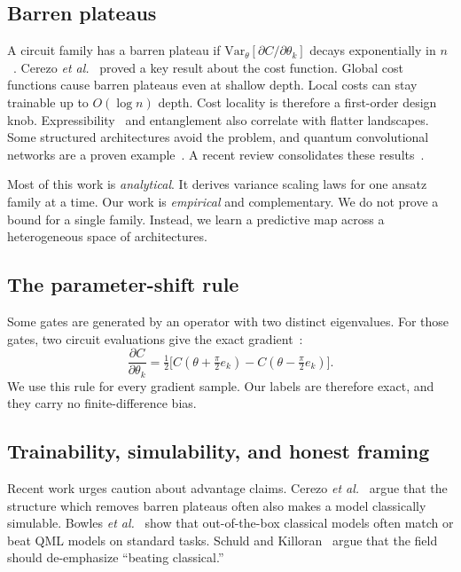 \documentclass[aps,pra,preprint,amsmath,amssymb,floatfix,nofootinbib]{revtex4-2}
\begin{document}
\subsection{Barren plateaus}
A circuit family has a barren plateau if
$\mathrm{Var}_\theta[\partial C/\partial\theta_k]$ decays exponentially in
$n$~\cite{mcclean2018barren}. Cerezo \textit{et al.}~\cite{cerezo2021cost} proved
a key result about the cost function. Global cost functions cause barren plateaus
even at shallow depth. Local costs can stay trainable up to $O(\log n)$ depth.
Cost locality is therefore a first-order design knob.
Expressibility~\cite{holmes2022expressibility} and entanglement also correlate
with flatter landscapes. Some structured architectures avoid the problem, and
quantum convolutional networks are a proven example~\cite{pesah2021absence}. A
recent review consolidates these results~\cite{larocca2025barren}.

Most of this work is \emph{analytical}. It derives variance scaling laws for one
ansatz family at a time. Our work is \emph{empirical} and complementary. We do
not prove a bound for a single family. Instead, we learn a predictive map across
a heterogeneous space of architectures.

\subsection{The parameter-shift rule}
Some gates are generated by an operator with two distinct eigenvalues. For those
gates, two circuit evaluations give the exact
gradient~\cite{mitarai2018circuit,schuld2019param}:
\begin{equation}
\frac{\partial C}{\partial\theta_k}
  = \tfrac{1}{2}\big[C(\theta + \tfrac{\pi}{2}e_k)
  - C(\theta - \tfrac{\pi}{2}e_k)\big].
\end{equation}
We use this rule for every gradient sample. Our labels are therefore exact, and
they carry no finite-difference bias.

\subsection{Trainability, simulability, and honest framing}
Recent work urges caution about advantage claims. Cerezo \textit{et
al.}~\cite{cerezo2025simulability} argue that the structure which removes barren
plateaus often also makes a model classically simulable. Bowles \textit{et
al.}~\cite{bowles2024benchmarking} show that out-of-the-box classical models
often match or beat QML models on standard tasks. Schuld and
Killoran~\cite{schuld2022killoran} argue that the field should de-emphasize
``beating classical.''
\end{document}
